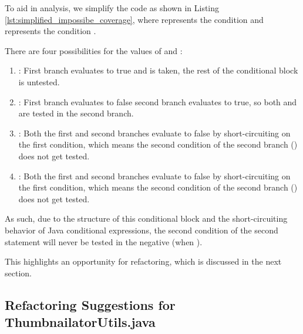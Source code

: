 \documentclass[12pt]{article}
\begin{document}
    To aid in analysis, we simplify the code as shown in Listing
        \ref{lst:simplified_impossibe_coverage}, where  represents the
        condition  and
         represents the condition
        .

    

    There are four possibilities for the values of  and :
    \begin{enumerate}
        \item
            :
                First branch evaluates to true and is taken, the rest of the
                    conditional block is untested.
        \item
            :
                First branch evaluates to false second branch evaluates to true,
                    so both  and  are tested in the second
                    branch.
        \item
            :
                Both the first and second branches evaluate to false by
                    short-circuiting on the first condition, which means the
                    second condition of the second branch () does not
                    get tested.
        \item
            :
                Both the first and second branches evaluate to false by
                    short-circuiting on the first condition, which means the
                    second condition of the second branch () does not
                    get tested.
    \end{enumerate}
    As such, due to the structure of this conditional block and the
        short-circuiting behavior of Java conditional expressions, the second
        condition of the second statement will never be tested in the negative
        (when ).

    This highlights an opportunity for refactoring, which is discussed in the
        next section.

    \markboth{}{}
    \subsection{Refactoring Suggestions for ThumbnailatorUtils.java}
    \markboth{}{}
\end{document}
